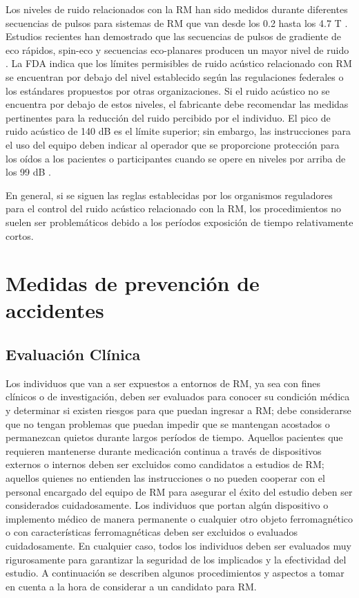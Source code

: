 Los niveles de ruido relacionados con la RM han sido medidos durante diferentes secuencias de pulsos para sistemas de RM que van desde los 0.2 hasta los 4.7 T \cite{Counter_2000,Shellock_2000}. Estudios recientes han demostrado que las secuencias de pulsos de gradiente de eco rápidos, spin-eco y secuencias eco-planares producen un mayor nivel de ruido \cite{Price_DeWilde_Papadaki_Curran_Kitney_2001,McJuryPhD_ShellockPhD_2000}. La FDA indica que los límites permisibles de ruido acústico relacionado con RM se encuentran por debajo del nivel establecido según las regulaciones federales o los estándares propuestos por otras organizaciones. Si el ruido acústico no se encuentra por debajo de estos niveles, el fabricante debe recomendar las medidas pertinentes para la reducción del ruido percibido por el individuo. El pico de ruido acústico de 140 dB es el límite superior; sin embargo, las instrucciones para el uso del equipo deben indicar al operador que se proporcione protección para los oídos a los pacientes o participantes cuando se opere en niveles por arriba de los 99 dB \cite{Shellock_2000}.

En general, si se siguen las reglas establecidas por los organismos reguladores para el control del ruido acústico relacionado con la RM, los procedimientos no suelen ser problemáticos debido a los períodos exposición de tiempo relativamente cortos.




\section{Medidas de prevención de accidentes}

\subsection{Evaluación Clínica}
Los individuos que van a ser expuestos a entornos de RM, ya sea con fines clínicos o de investigación, deben ser evaluados para conocer su condición médica y determinar si existen riesgos para que puedan ingresar a RM; debe considerarse que no tengan problemas que puedan impedir que se mantengan acostados o permanezcan quietos durante largos períodos de tiempo. Aquellos pacientes que requieren mantenerse durante medicación continua a través de dispositivos externos o internos deben ser excluidos como candidatos a estudios de RM; aquellos quienes no entienden las instrucciones o no pueden cooperar con el personal encargado del equipo de RM para asegurar el éxito del estudio deben ser considerados cuidadosamente. Los individuos que portan algún dispositivo o implemento médico de manera permanente o cualquier otro objeto ferromagnético o con características ferromagnéticas deben ser excluidos o evaluados cuidadosamente. En cualquier caso, todos los individuos deben ser evaluados muy rigurosamente para garantizar la seguridad de los implicados y la efectividad del estudio. A continuación se describen algunos procedimientos y aspectos a tomar en cuenta a la hora de considerar a un candidato para RM.

